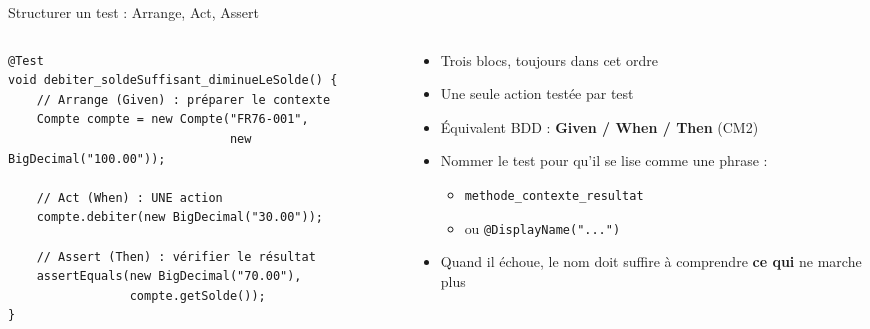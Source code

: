 \documentclass[aspectratio=169,10pt]{beamer}
\begin{document}
\begin{frame}[fragile]{Structurer un test : Arrange, Act, Assert}
  \begin{columns}[T]
    \begin{column}{0.6\textwidth}
\begin{lstlisting}[basicstyle=\lstcode\scriptsize]
@Test
void debiter_soldeSuffisant_diminueLeSolde() {
    // Arrange (Given) : préparer le contexte
    Compte compte = new Compte("FR76-001",
                               new BigDecimal("100.00"));

    // Act (When) : UNE action
    compte.debiter(new BigDecimal("30.00"));

    // Assert (Then) : vérifier le résultat
    assertEquals(new BigDecimal("70.00"),
                 compte.getSolde());
}
\end{lstlisting}
    \end{column}
    \begin{column}{0.37\textwidth}
      \begin{itemize}
        \item Trois blocs, toujours dans cet ordre
        \item Une seule action testée par test
        \item Équivalent BDD : \textbf{Given / When / Then} (CM2)
        \item Nommer le test pour qu'il se lise comme une phrase :
          \begin{itemize}
            \item {\scriptsize\texttt{methode\_contexte\_resultat}}
            \item ou \texttt{@DisplayName("...")}
          \end{itemize}
        \item Quand il échoue, le nom doit suffire à comprendre \textbf{ce qui} ne marche plus
      \end{itemize}
    \end{column}
  \end{columns}
\end{frame}
\end{document}
